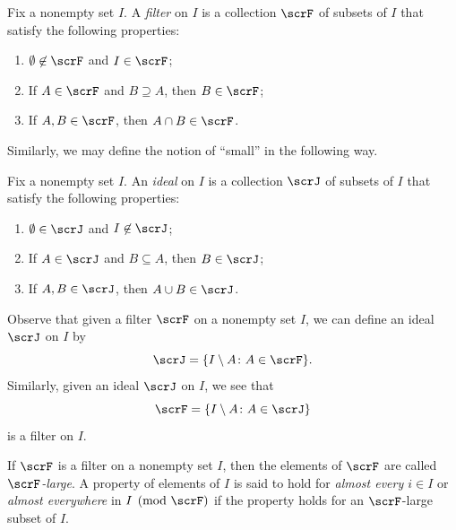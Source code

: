 \begin{definition}
  \label{def:filter}

  Fix a nonempty set $I$.
  A \emph{filter} on $I$ is a collection $\scrF$ of subsets of $I$ that satisfy the following properties:

  \begin{enumerate}
  \item
    $\emptyset\not\in\scrF$ and $I\in \scrF$;
  \item
    If $A\in\scrF$ and $B\supseteq A$, then $B\in\scrF$;
  \item
    If $A,B\in \scrF$, then $A\cap B\in\scrF$.

  \end{enumerate}
\end{definition}

Similarly, we may define the notion of “small” in the following way.

\begin{definition}
  \label{def:ideal}

  Fix a nonempty set $I$.
  An \emph{ideal} on $I$ is a collection $\scrJ$ of subsets of $I$ that satisfy the following properties:

  \begin{enumerate}
  \item
    $\emptyset\in\scrJ$ and $I\not\in \scrJ$;
  \item
    If $A\in\scrJ$ and $B\subseteq A$, then $B\in\scrJ$;
  \item
    If $A,B\in \scrJ$, then $A\cup B\in\scrJ$.

  \end{enumerate}

\end{definition}

Observe that given a filter $\scrF$ on a nonempty set $I$, we can define an ideal $\scrJ$ on $I$ by \[\scrJ=\{I\setminus A \colon A\in\scrF\}\text{.}\]
Similarly, given an ideal $\scrJ$ on $I$, we see that \[\scrF = \{I\setminus A \colon A\in \scrJ\}\] is a filter on $I$.

\begin{notation}
  \label{notn:large-sets}
  If $\scrF$ is a filter on a nonempty set $I$, then the elements of $\scrF$ are called \emph{$\scrF$-large}.
  A property of elements of $I$ is said to hold for \emph{almost every $i\in I$} or \emph{almost everywhere} in $I \pmod{\scrF}$ if the property holds for an $\scrF$-large subset of $I$.
\end{notation}

